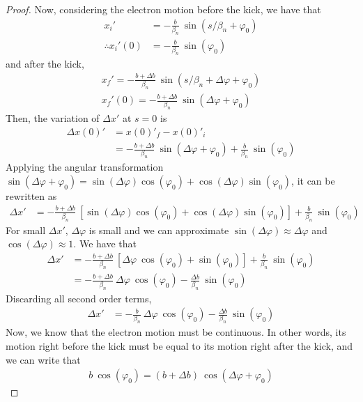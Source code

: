 \begin{proof}
	Now, considering the electron motion before the kick, we have that
	\begin{align*}
		x_i' &= -\frac{b}{\beta_n}\ \sin(s/\beta_n + \varphi_0)\\
		\therefore x_i'(0) &= -\frac{b}{\beta_n}\ \sin(\varphi_0)
	\end{align*}
	and after the kick,
	\begin{align*}
		x_f' = -\frac{b+\Delta b}{\beta_n}\ \sin(s/\beta_n + \Delta \varphi + \varphi_0)\\
		x_f'(0) = -\frac{b+\Delta b}{\beta_n}\ \sin(\Delta \varphi + \varphi_0)
	\end{align*}
	Then, the variation of $\Delta x'$ at $s=0$ is
	\begin{align*}
		\Delta x(0)' &= x(0)'_f - x(0)'_i\\
				  &= -\frac{b+\Delta b}{\beta_n}\ \sin(\Delta \varphi + \varphi_0) + \frac{b}{\beta_n}\ \sin(\varphi_0)
	\end{align*}
	Applying the angular transformation $\sin(\Delta \varphi + \varphi_0) = \sin(\Delta \varphi)\cos(\varphi_0) + \cos(\Delta \varphi)\sin(\varphi_0)$, it can be rewritten as
	\begin{align*}
		\Delta x' &= -\frac{b+\Delta b}{\beta_n}\ [\sin(\Delta \varphi)\cos(\varphi_0) + \cos(\Delta \varphi)\sin(\varphi_0)] + \frac{b}{\beta_n}\ \sin(\varphi_0)
	\end{align*}
	For small $\Delta x'$, $\Delta \varphi$ is small and we can approximate $\sin(\Delta \varphi) \approx \Delta \varphi$ and $\cos(\Delta \varphi) \approx 1$. We have that
	\begin{align*}
		\Delta x' &= -\frac{b+\Delta b}{\beta_n}\ [\Delta \varphi\ \cos(\varphi_0) + \sin(\varphi_0)] + \frac{b}{\beta_n}\ \sin(\varphi_0)\\
				  &= -\frac{b+\Delta b}{\beta_n}\ \Delta \varphi\ \cos(\varphi_0) - \frac{\Delta b}{\beta_n}\ \sin(\varphi_0)
	\end{align*}
	Discarding all second order terms,
	\begin{align*}
		\Delta x' &= -\frac{b}{\beta_n}\ \Delta \varphi\ \cos(\varphi_0) - \frac{\Delta b}{\beta_n}\ \sin(\varphi_0)
	\end{align*}
	Now, we know that the electron motion must be continuous. In other words, its motion right before the kick must be equal to its motion right after the kick, and we can write that
	\begin{align*}
		b\ \cos(\varphi_0) = (b+\Delta b)\ \cos(\Delta \varphi + \varphi_0)
	\end{align*}

\end{proof}
